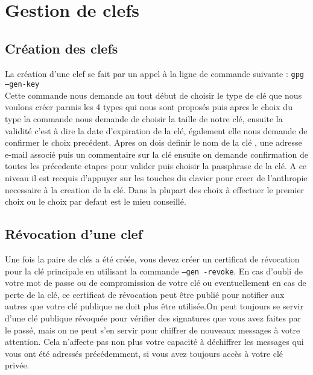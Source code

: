 
\section{Gestion de clefs}
\subsection{Création des clefs}
 La création d'une clef se fait par un appel à la ligne de commande suivante : \texttt{gpg --gen-key}\\
Cette commande nous demande au tout début de choisir le type de clé que nous voulons créer parmis les 4 types qui nous sont
proposés puis apres le choix du type la commande nous demande de choisir la taille de notre clé, ensuite la validité
c'est à dire la date d'expiration de la clé, également elle nous demande de confirmer le choix precédent.
Apres on dois definir le nom de la clé , une adresse e-mail associé puis un commentaire sur la clé ensuite on demande confirmation de
toutes les précedente etapes pour valider puis choisir la passphrase de la clé.
A ce niveau il est recquis d'appuyer sur les touches du clavier pour creer de l'anthropie necessaire à la creation de la clé.
Dans la plupart des choix à effectuer le premier choix ou le choix par defaut est le mieu conseillé.

\subsection{Révocation d'une clef}
 Une fois la paire de clés a été créée, vous devez créer un certificat de révocation pour la clé principale en utilisant la commande \texttt
{--gen -revoke}. En cas d'oubli de votre mot de passe ou de compromission de votre clé ou eventuellement en cas de perte de la clé, ce certificat de révocation peut être publié pour notifier aux autres que votre clé publique ne doit plus être utilisée.On peut toujours se servir d'une clé publique révoquée pour vérifier des signatures que vous avez faites par le passé, mais on ne peut s'en servir pour chiffrer de nouveaux messages à votre attention. Cela n'affecte pas non plus votre capacité à déchiffrer les messages qui vous ont été adressés précédemment, si vous avez toujours accès à votre clé privée.
